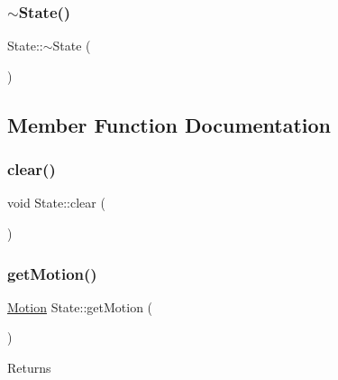 \mbox{\label{class_state_afab438d92b90dc18d194dbd9c9c8bab3}} 
\subsubsection{\texorpdfstring{$\sim$\+State()}{~State()}}
{\footnotesize\ttfamily State\+::$\sim$\+State (\begin{DoxyParamCaption}{ }\end{DoxyParamCaption})}



\subsection{Member Function Documentation}
\mbox{\label{class_state_aed3bf8334ee32e0cccba11fc2dc42b68}} 
\subsubsection{\texorpdfstring{clear()}{clear()}}
{\footnotesize\ttfamily void State\+::clear (\begin{DoxyParamCaption}{ }\end{DoxyParamCaption})}

\mbox{\label{class_state_adcabc610335b5bd9efdf7f908de7dacb}} 
\subsubsection{\texorpdfstring{get\+Motion()}{getMotion()}}
{\footnotesize\ttfamily \mbox{\hyperlink{class_motion}{Motion}} State\+::get\+Motion (\begin{DoxyParamCaption}{ }\end{DoxyParamCaption})}

\begin{DoxyReturn}{Returns}

\end{DoxyReturn}
\mbox{\label{class_state_a9195abef447816fe4830f875f0b1dda2}} 
